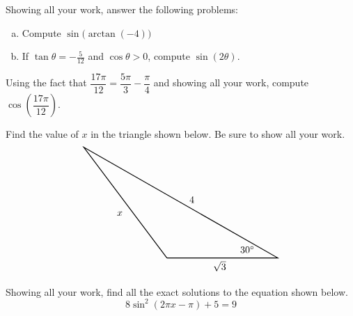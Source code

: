 \documentclass[12pt,letterpaper]{exam}
\begin{document}
\begin{questions}
\newpage
\question[20] Showing all your work, answer the following problems: \par\vspace{0.1cm}
	\begin{enumerate}[(a)]
	\item Compute $\sin \!\big( \!\arctan(-4) \big)$ \vfill
	\item If $\tan \theta= -\frac{5}{12}$ and $\cos \theta > 0$, compute $\sin(2 \theta)$. \vfill
	\end{enumerate}



\newpage
\question[10] Using the fact that $\dfrac{17\pi}{12}= \dfrac{5\pi}{3} - \dfrac{\pi}{4}$ and showing all your work, compute $\cos \left( \dfrac{17\pi}{12} \right)$. 



\newpage
\question[15] Find the value of $x$ in the triangle shown below. Be sure to show all your work.
	\[
	\begin{tikzpicture}
	\draw[line width=0.03cm] (0,0) -- (-3,4) -- (4,0) -- (0,0);
	\node at (-1.7,1.6) {$x$};
	\node at (1.9,-0.3) {$\sqrt{3}$};
	\node at (0.9,2.1) {$4$};
	\node at (2.9,0.3) {$30^\circ$};
	\end{tikzpicture}
	\]



\newpage
\question[15] Showing all your work, find all the exact solutions to the equation shown below. 
	\[
	8 \sin^2(2 \pi x - \pi) + 5= 9
	\]

\end{questions}
\end{document}
